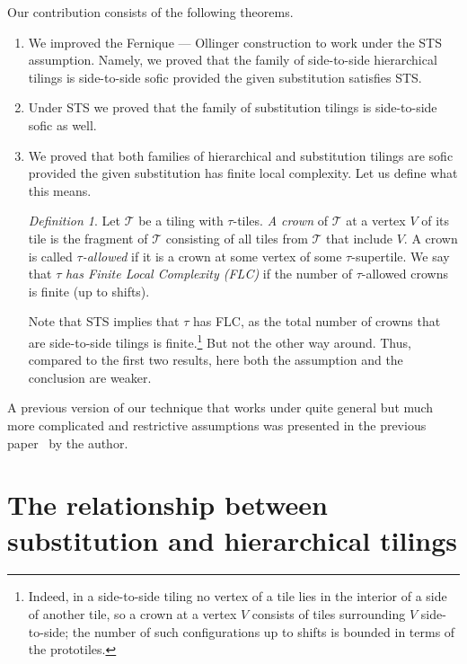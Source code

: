 \documentclass[12pt]{article}
\theoremstyle{remark}
\newtheorem{definition}{Definition}
\begin{document}
Our contribution consists of the following theorems.
\begin{enumerate}
\item We improved the Fernique --- Ollinger construction
to work 
under the STS assumption.
Namely, we proved that the family of side-to-side
hierarchical tilings
is  side-to-side sofic provided the given substitution satisfies STS.  

\item
Under STS
we proved that the  family of substitution  tilings
is side-to-side sofic as well.  

\item 
We proved that 
both families of hierarchical and substitution tilings are 
sofic provided  the given substitution  has finite local complexity. Let us define what this means.
\begin{definition} \label{cr-all}
Let $\mathcal{T}$ be a tiling  with $\tau$-tiles.
  \emph{A crown} of  $\mathcal{T}$  at a vertex $V$ of its tile is the fragment
  of $\mathcal{T}$ consisting of all tiles
  from $\mathcal{T}$ that include $V$. 
  A crown is called \emph{$\tau$-allowed} if it is a crown at some vertex of some $\tau$-supertile.
 We say that $\tau$ \emph{has Finite Local Complexity (FLC)} if 
the number of $\tau$-allowed crowns is finite (up to shifts). 
\end{definition}
Note that STS implies that $\tau$ has FLC, as the total number of crowns that are side-to-side tilings is finite.\footnote{
Indeed, in a side-to-side tiling no vertex of a tile lies in the interior of a side of another tile,
so a crown at a vertex $V$ consists of tiles surrounding $V$ side-to-side; the number of such
	configurations up to shifts is bounded in terms of the prototiles.}
But not the other way around. Thus,
compared to the first two results, here both the assumption and the conclusion are weaker. 
\end{enumerate}

A previous version of our technique that works under quite general but 
much more complicated and restrictive assumptions was presented in the previous 
paper~\cite{ver} by the author.


\section{The relationship between substitution and hierarchical tilings}
\end{document}
